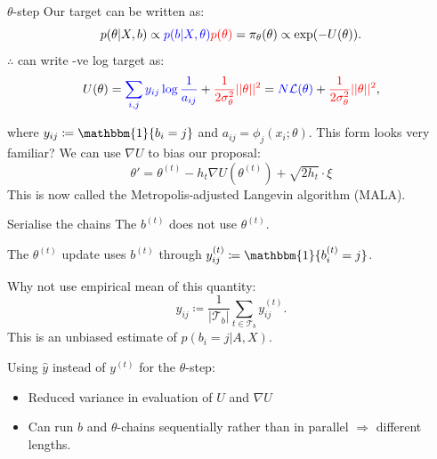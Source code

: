\documentclass{beamer}
\newcommand{\Lcal}{\mathcal{L}}
\newcommand{\Tcal}{\mathcal{T}}
\newcommand{\one}{\mathbbm{1}}
\begin{document}
	\begin{frame}{$\theta$-step}
		Our target can be written as:
		$$p(\theta | X, b) \propto
		{\color{blue} p(b |X, \theta)} 
		{\color{red}p(\theta)}
		= \pi_\theta(\theta) \propto \exp(-U(\theta)).$$
		$\therefore$ can write -ve log target as:
		$$U(\theta) 
		= {\color{blue} \sum_{i,j} y_{ij} \log \frac{1}{a_{ij}} } + 
		{\color{red} \frac{1}{2\sigma_\theta^2} || \theta ||^2} 
		= {\color{blue} N \Lcal(\theta)} 
		+ {\color{red} \frac{1}{2\sigma_\theta^2} ||\theta||^2 },$$
		
		where $y_{ij} \coloneqq \one \{b_i = j\}$ and $a_{ij} = \phi_{j}(x_i; \theta)$. This form looks very familiar? We can use $\nabla U$ to bias our proposal:
		$$\theta' = \theta^{(t)} - h_t \nabla U \left(\theta^{(t)} \right) + \sqrt{2h_t} \cdot \xi$$
		This is now called the Metropolis-adjusted Langevin algorithm (MALA).
	\end{frame}
	
	\begin{frame}{Serialise the chains}
		The $b^{(t)}$ does not use $\theta^{(t)}$.
		
		The $\theta^{(t)}$ update uses $b^{(t)}$ through $y^{(t)}_{ij} \coloneqq \one\{b^{(t)}_i = j\}$.
		
		Why not use empirical mean of this quantity:		
		$$\hat{y}_{ij} \coloneqq \frac{1}{|\Tcal_b|} \sum_{t \in \Tcal_b} y_{ij}^{(t)}.$$
		This is an unbiased estimate of $p(b_i=j|A,X)$.
		
		Using $\hat{y}$ instead of $y^{(t)}$ for the $\theta$-step:
		\begin{itemize}
			\item Reduced variance in evaluation of $U$ and $\nabla U$
			\item Can run $b$ and $\theta$-chains sequentially rather than in parallel $\Rightarrow$ different lengths.
		\end{itemize}
	\end{frame}
\end{document}
